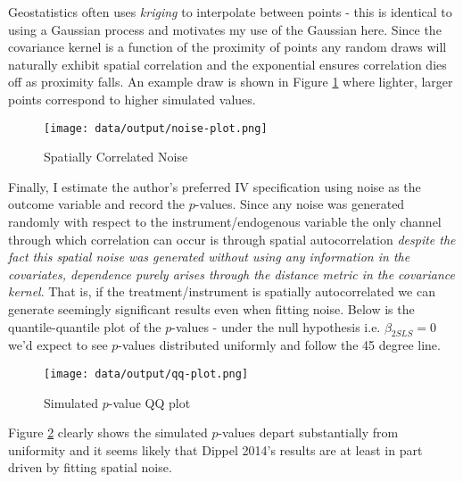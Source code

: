 \documentclass[12pt]{article}
\begin{document}
Geostatistics often uses  \textit{kriging} to interpolate between points - this is identical to using a Gaussian process and motivates 
my use of the Gaussian here. Since the covariance kernel is a function of the proximity of points any random draws will naturally exhibit spatial 
correlation and the exponential ensures correlation dies off as proximity falls. An example draw is shown in Figure \ref{noise} where lighter, larger 
points correspond to higher simulated values.


\begin{figure}[htbp]
    \centering
    \texttt{[image: data/output/noise-plot.png]}
    \caption{Spatially Correlated Noise}
    \label{noise}
\end{figure}

Finally, I estimate the author's preferred IV specification using noise as the outcome variable and record the $p$-values. Since any noise 
was generated randomly with respect to the instrument/endogenous variable the only channel through which correlation can occur is through spatial 
autocorrelation \textit{despite the fact this spatial noise was generated without using any information in the covariates, dependence purely arises through 
the distance metric in the covariance kernel}. That is, if the treatment/instrument is spatially autocorrelated we can generate seemingly significant results 
even when fitting noise. Below is the quantile-quantile plot of the $p$-values - under the null hypothesis i.e. $\beta_{2SLS} = 0$ we'd expect to see $p$-values 
distributed uniformly and follow the 45 degree line.   

\begin{figure}[htbp]
    \centering
    \texttt{[image: data/output/qq-plot.png]}
    \caption{Simulated $p$-value QQ plot}
    \label{qq}
\end{figure}

Figure \ref{qq} clearly shows the simulated $p$-values depart substantially from uniformity and it seems likely that Dippel 2014's results are at least 
in part driven by fitting spatial noise.



\FloatBarrier


\end{document}
